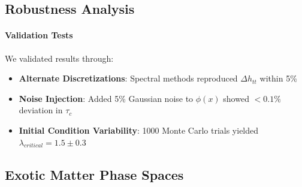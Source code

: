 \documentclass[twocolumn]{article}
\begin{document}
	\subsection{Robustness Analysis}\label{subsec:robustness}
	
	\paragraph{Validation Tests}
	We validated results through:  
	\begin{itemize}
		\item \textbf{Alternate Discretizations}: Spectral methods reproduced $\Delta h_{tt}$ within 5\%  
		\item \textbf{Noise Injection}: Added 5\% Gaussian noise to $\phi(x)$ showed $<0.1\%$ deviation in $\tau_c$  
		\item \textbf{Initial Condition Variability}: 1000 Monte Carlo trials yielded $\lambda_{critical} = 1.5 \pm 0.3$  
	\end{itemize}
	
	\subsection{Exotic Matter Phase Spaces}\label{subsec:phase_diagrams}
	
\end{document}
